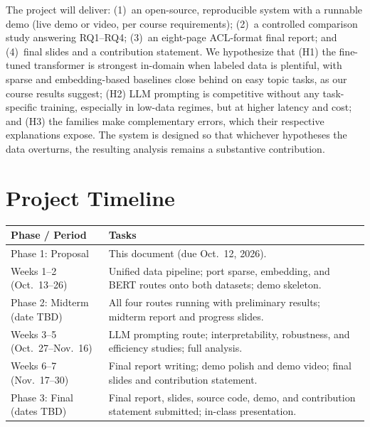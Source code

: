 \documentclass[11pt]{article}
\begin{document}
The project will deliver: (1)~an open-source, reproducible system with a runnable demo (live demo or video, per course requirements); (2)~a controlled comparison study answering RQ1--RQ4; (3)~an eight-page ACL-format final report; and (4)~final slides and a contribution statement. We hypothesize that (H1) the fine-tuned transformer is strongest in-domain when labeled data is plentiful, with sparse and embedding-based baselines close behind on easy topic tasks, as our course results suggest; (H2) LLM prompting is competitive without any task-specific training, especially in low-data regimes, but at higher latency and cost; and (H3) the families make complementary errors, which their respective explanations expose. The system is designed so that whichever hypotheses the data overturns, the resulting analysis remains a substantive contribution.

\section{Project Timeline}

{\small
\begin{tabular}{@{}p{2.4cm}p{4.85cm}@{}}
\toprule
\textbf{Phase / Period} & \textbf{Tasks} \\
\midrule
Phase 1: Proposal & This document (due Oct.\ 12, 2026). \\
\midrule
Weeks 1--2 (Oct.\ 13--26) & Unified data pipeline; port sparse, embedding, and BERT routes onto both datasets; demo skeleton. \\
\midrule
Phase 2: Midterm (date TBD) & All four routes running with preliminary results; midterm report and progress slides. \\
\midrule
Weeks 3--5 (Oct.\ 27--Nov.\ 16) & LLM prompting route; interpretability, robustness, and efficiency studies; full analysis. \\
\midrule
Weeks 6--7 (Nov.\ 17--30) & Final report writing; demo polish and demo video; final slides and contribution statement. \\
\midrule
Phase 3: Final (dates TBD) & Final report, slides, source code, demo, and contribution statement submitted; in-class presentation. \\
\bottomrule
\end{tabular}
}


\end{document}
